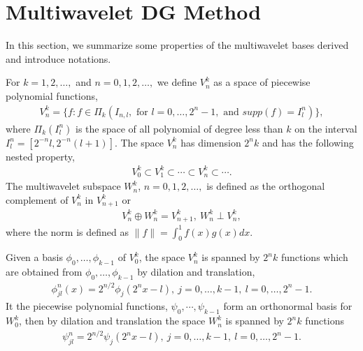 \documentclass[final,leqno]{siamltex704}
\begin{document}
\section{Multiwavelet DG Method}
In this section, we summarize some properties of the multiwavelet bases derived and introduce notations. 

For $k=1,2,\dots,$ and $n=0,1,2,\dots,$ we define $V_n^k$ as a space of piecewise polynomial functions,
\begin{eqnarray}
V_n^k=\{f:f\in\Pi_k(I_{n,l},\text{ for }l=0,\dots,2^n-1,\text{ and }supp(f)=I_l^n)\},
\end{eqnarray}
where $\Pi_k(I_l^n)$ is the space of all polynomial of degree less than $k$ on the interval $I_l^n=[2^{-n}l,2^{-n}(l+1)]$. The space $V_n^k$ has dimension $2^nk$ and has the following nested property,
\begin{eqnarray}
V_0^k\subset V_1^k\subset\cdots\subset V_n^k\subset \cdots.
\end{eqnarray}
The multiwavelet subspace $W_n^k$, $n=0,1,2,\dots,$ is defined as the orthogonal complement of $V_n^k$ in $V_{n+1}^k$ or
\begin{eqnarray}
V_n^k\oplus W_n^k=V_{n+1}^k,\ W_n^k\perp V_n^k,
\end{eqnarray}
where the norm is defined as $\|f\|=\int_0^1 f(x)g(x)dx.$ 

Given a basis $\phi_0,\dots,\phi_{k-1}$ of $V_0^k$, the space $V_n^k$ is spanned by $2^nk$ functions which are obtained from $\phi_0,\dots,\phi_{k-1}$ by dilation and translation,
\begin{eqnarray}
\phi_{jl}^n(x)=2^{n/2}\phi_j(2^nx-l),\ j=0,\dots,k-1,\ l=0,\dots,2^n-1.
\end{eqnarray}
It the piecewise polynomial functions, $\psi_0,\cdots,\psi_{k-1}$ form an orthonormal basis for $W_0^k$, then by dilation and translation the space $W_n^k$ is spanned by $2^nk$ functions
\begin{eqnarray}
\psi_{jl}^n=2^{n/2}\psi_j(2^nx-l),\ j=0,\dots,k-1,\ l=0,\dots,2^n-1.
\end{eqnarray}
\end{document}
